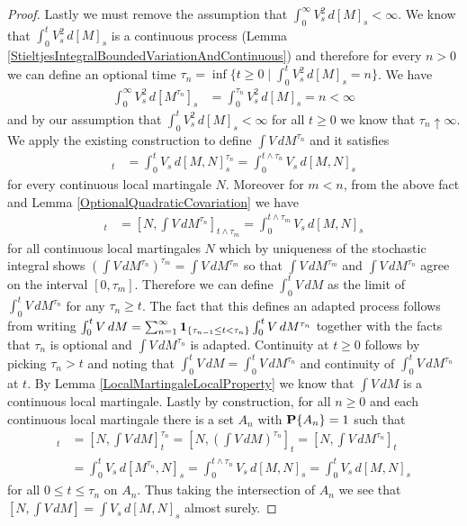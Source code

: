\begin{proof}
Lastly we must remove the assumption that $\int_0^\infty V_s^2 \, d[M]_s < \infty$.  We know that $\int_0^t V_s^2 \, d[M]_s$ is a continuous process (Lemma \ref{StieltjesIntegralBoundedVariationAndContinuous}) and therefore for every $n >0$ we can define an optional time $\tau_n = \inf \lbrace t \geq 0 \mid \int_0^t V_s^2 \, d[M]_s = n \rbrace$.  We have
\begin{align*}
\int_0^\infty V_s^2 \, d[M^{\tau_n}]_s &= \int_0^{\tau_n} V^2_s \, d[M]_s = n < \infty
\end{align*}
and by our assumption that $\int_0^t V_s^2 \, d[M]_s < \infty$ for all $t \geq 0$ we know that $\tau_n \uparrow \infty$.  We apply the existing construction to define $\int V \, dM^{\tau_n}$ and it satisfies 
\begin{align*}
[N, \int V \, dM^{\tau_n}]_t  &= \int_0^t V_s \, d[M,N]^{\tau_n}_s = \int_0^{t\wedge\tau_n} V_s \, d[M,N]_s
\end{align*}
for every continuous local martingale $N$.  Moreover for $m < n$, from the above fact and Lemma \ref{OptionalQuadraticCovariation} we have
\begin{align*}
[N, \left(\int V \, dM^{\tau_n}\right)^{\tau_m}]_t &= [N, \int V \, dM^{\tau_n}]_{t \wedge \tau_m} =\int_0^{t\wedge\tau_m} V_s \, d[M,N]_s
\end{align*}
for all continuous local martingales $N$ which by uniqueness of the stochastic integral shows $\left(\int V \, dM^{\tau_n}\right)^{\tau_m} = \int V \, dM^{\tau_m}$ so that $\int V \, dM^{\tau_m}$ and $\int V \, dM^{\tau_n}$ agree on the interval $[0,\tau_m]$.  Therefore we can define $\int_0^t V \, dM$ as the limit of $\int_0^t V \, dM^{\tau_n}$ for any $\tau_n \geq t$.  The fact that this defines an adapted process follows from writing $\int_0^t V \, dM = \sum_{n=1}^\infty \textbf{1}_{\lbrace \tau_{n-1} \leq t < \tau_n\rbrace} \int_0^t V \, dM^{\tau_n}$ together with the facts that $\tau_n$ is optional and $\int V \, dM^{\tau_n}$ is adapted.  Continuity at $t \geq 0$ follows by picking $\tau_n > t$ and noting that $\int_0^t V \, dM = \int_0^t V \, dM^{\tau_n}$ and continuity of $\int_0^t V \, dM^{\tau_n}$ at $t$.  By Lemma \ref{LocalMartingaleLocalProperty} we know that $\int V \, dM$ is a continuous local martingale.  Lastly by construction, for all $n \geq 0$ and each continuous local martingale there is a set $A_n$ with $\textbf{P}\{A_n\} =1$ such that
\begin{align*}
[N, \int V \, dM]_t &=[N, \int V \, dM]^{\tau_n}_t = [N, \left(\int V \, dM\right)^{\tau_n}]_t = [N, \int V \, dM^{\tau_n}]_t \\
&= \int_0^t V_s \, d[M^{\tau_n}, N]_s = \int_0^{t\wedge \tau_n} V_s \, d[M, N]_s = \int_0^{t} V_s \, d[M, N]_s
\end{align*}
for all $0 \leq t \leq \tau_n$ on $A_n$.  Thus taking the intersection of $A_n$ we see that $[N, \int V \, dM] = \int V_s \, d[M,N]_s$ almost surely.
\end{proof}

